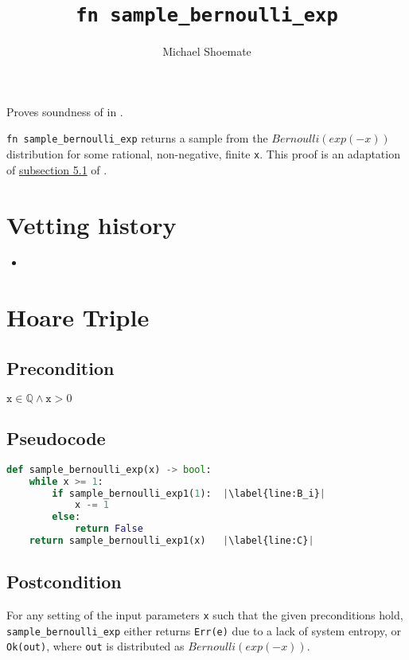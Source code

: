 \documentclass{article}
\title{\texttt{fn sample\_bernoulli\_exp}}
\author{Michael Shoemate}
\begin{document}
\maketitle

\contrib
Proves soundness of  in .

\texttt{fn sample\_bernoulli\_exp} returns a sample from the $Bernoulli(exp(-x))$ distribution for some rational, non-negative, finite \texttt{x}.
This proof is an adaptation of \href{https://arxiv.org/pdf/2004.00010.pdf#subsection.5.1}{subsection 5.1} of \cite{CKS20}.

\section*{Vetting history}
\begin{itemize}
    \item {}
\end{itemize}

\section{Hoare Triple}
\subsection*{Precondition}
$\texttt{x} \in \mathbb{Q} \land \texttt{x} > 0$

\subsection*{Pseudocode}        
\begin{lstlisting}[language=Python, escapechar=|]
def sample_bernoulli_exp(x) -> bool:
    while x >= 1:
        if sample_bernoulli_exp1(1):  |\label{line:B_i}|
            x -= 1
        else: 
            return False
    return sample_bernoulli_exp1(x)   |\label{line:C}|
\end{lstlisting}

\subsection*{Postcondition}
\label{postcondition}
For any setting of the input parameters \texttt{x} such that the given preconditions hold, \\
\texttt{sample\_bernoulli\_exp} either returns \texttt{Err(e)} due to a lack of system entropy,
or \texttt{Ok(out)}, where \texttt{out} is distributed as $Bernoulli(exp(-x))$.
\end{document}
